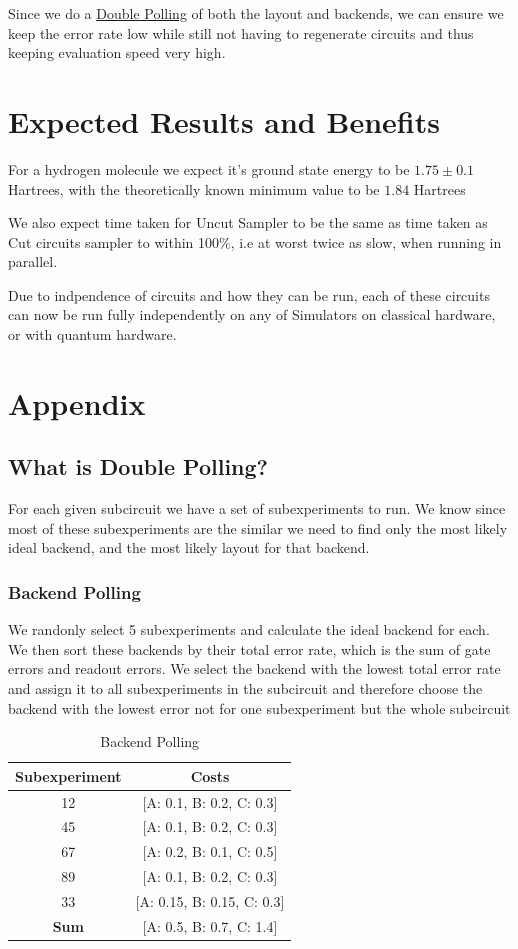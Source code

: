 \documentclass[hidelinks]{book}
\numberwithin{equation}{section}
\begin{document}
Since we do a \hyperref[sec:hello]{Double Polling} of both the layout and backends, we can ensure we keep the error rate low while still not having to regenerate circuits and thus keeping evaluation speed very high.

\section{Expected Results and Benefits}\label{conclusion}
For a hydrogen molecule we expect it's ground state energy to be $1.75\pm 0.1$ Hartrees, with the theoretically known minimum value to be $1.84$ Hartrees

We also expect time taken for Uncut Sampler to be the same as time taken as Cut circuits sampler to within 100\%, i.e at worst twice as slow, when running in parallel.

Due to indpendence of circuits and how they can be run, each of these circuits can now be run fully independently on any of Simulators on classical hardware, or with quantum hardware.

\section{Appendix}\label{appendix}
\subsection{What is Double Polling?}\label{double-polling}
For each given subcircuit we have a set of subexperiments to run. We know since most of these subexperiments are the similar we need to find only the most likely ideal backend, and the most likely layout for that backend.

\subsubsection{Backend Polling}\label{backend-polling}
We randonly select 5 subexperiments and calculate the ideal backend for each. We then sort these backends by their total error rate, which is the sum of gate errors and readout errors. We select the backend with the lowest total error rate and assign it to all subexperiments in the subcircuit and therefore choose the backend with the lowest error not for one subexperiment but the whole subcircuit

\begin{table}[H]
\centering
\begin{tabular}{|c|c|}
\hline
\textbf{Subexperiment} & \textbf{Costs} \\ \hline
12 & {[}A: 0.1, B: 0.2, C: 0.3{]} \\ \hline
45 & {[}A: 0.1, B: 0.2, C: 0.3{]} \\ \hline
67 & {[}A: 0.2, B: 0.1, C: 0.5{]} \\ \hline
89 & {[}A: 0.1, B: 0.2, C: 0.3{]} \\ \hline
33 & {[}A: 0.15, B: 0.15, C: 0.3{]} \\ \hline
\textbf{Sum} & {[}A: 0.5, B: 0.7, C: 1.4{]} \\ \hline
\end{tabular}
\caption{Backend Polling}
\end{table}
\end{document}
